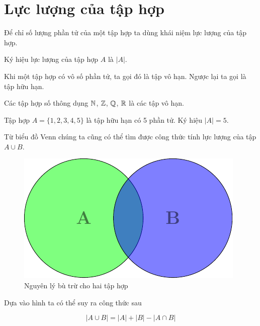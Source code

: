 \section{Lực lượng của tập hợp}

Để chỉ số lượng phần tử của một tập hợp ta dùng khái niệm lực lượng của tập hợp.

Ký hiệu lực lượng của tập hợp $A$ là $\lvert A \rvert$.

Khi một tập hợp có vô số phần tử, ta gọi đó là tập vô hạn. Ngược lại ta gọi là
tập hữu hạn.

\begin{example}
    Các tập hợp số thông dụng $\mathbb{N}$, $\mathbb{Z}$, $\mathbb{Q}$, $\mathbb{R}$ là các tập vô hạn.

    Tập hợp $A = \{ 1, 2, 3, 4, 5 \}$ là tập hữu hạn có 5 phần tử. Ký hiệu
    $\lvert A \rvert = 5$.
\end{example}

Từ biểu đồ Venn chúng ta cũng có thể tìm được công thức tính lực lượng của tập
$A \cup B$.

\begin{figure}[ht]
    \centering
    \includegraphics{../pics/set/venn1.pdf}
    \caption{Nguyên lý bù trừ cho hai tập hợp}
    \label{set4}
\end{figure}

Dựa vào hình ta có thể suy ra công thức sau

\begin{equation}
    \lvert A \cup B \rvert = \lvert A \rvert + \lvert B \rvert - \lvert A \cap B \rvert
\end{equation}

